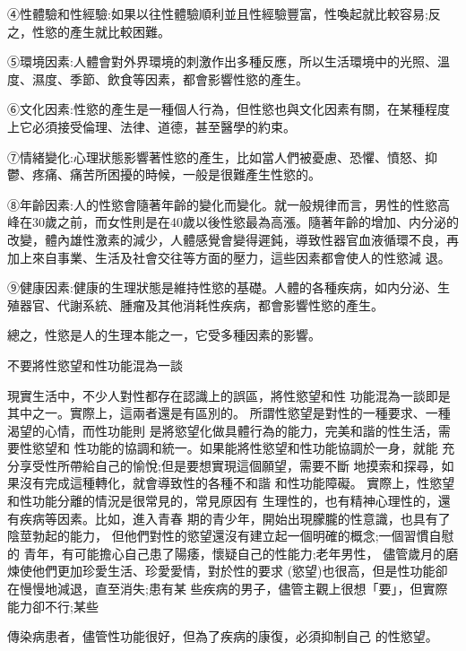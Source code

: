 \documentclass[12pt,UTF8]{ctexbook}
\begin{document}
④性體驗和性經驗:如果以往性體驗順利並且性經驗豐富，性喚起就比較容易;反之，性慾的產生就比較困難。

⑤環境因素:人體會對外界環境的刺激作出多種反應，所以生活環境中的光照、溫度、濕度、季節、飲食等因素，都會影響性慾的產生。

⑥文化因素:性慾的產生是一種個人行為，但性慾也與文化因素有關，在某種程度上它必須接受倫理、法律、道德，甚至醫學的約束。

⑦情緒變化:心理狀態影響著性慾的產生，比如當人們被憂慮、恐懼、憤怒、抑鬱、疼痛、痛苦所困擾的時候，一般是很難產生性慾的。

⑧年齡因素:人的性慾會隨著年齡的變化而變化。就一般規律而言，男性的性慾高峰在30歲之前，而女性則是在40歲以後性慾最為高漲。隨著年齡的增加、内分泌的改變，體內雄性激素的減少，人體感覺會變得遲鈍，導致性器官血液循環不良，再加上來自事業、生活及社會交往等方面的壓力，這些因素都會使人的性慾減
退。

⑨健康因素:健康的生理狀態是維持性慾的基礎。人體的各種疾病，如内分泌、生殖器官、代謝系統、腫瘤及其他消耗性疾病，都會影響性慾的產生。

總之，性慾是人的生理本能之一，它受多種因素的影響。

不要將性慾望和性功能混為一談

現實生活中，不少人對性都存在認識上的誤區，將性慾望和性
功能混為一談即是其中之一。實際上，這兩者還是有區別的。
所謂性慾望是對性的一種要求、一種渴望的心情，而性功能則
是將慾望化做具體行為的能力，完美和諧的性生活，需要性慾望和
性功能的協調和統一。如果能將性慾望和性功能協調於一身，就能
充分享受性所帶給自己的愉悅;但是要想實現這個願望，需要不斷
地摸索和探尋，如果沒有完成這種轉化，就會導致性的各種不和諧
和性功能障礙。
實際上，性慾望和性功能分離的情況是很常見的，常見原因有
生理性的，也有精神心理性的，還有疾病等因素。比如，進入青春
期的青少年，開始出現朦朧的性意識，也具有了陰莖勃起的能力，
但他們對性的慾望還沒有建立起一個明確的概念;一個習慣自慰的
青年，有可能擔心自己患了陽痿，懷疑自己的性能力;老年男性，
儘管歲月的磨煉使他們更加珍愛生活、珍愛愛情，對於性的要求
(慾望)也很高，但是性功能卻在慢慢地減退，直至消失;患有某
些疾病的男子，儘管主觀上很想「要」，但實際能力卻不行;某些

傳染病患者，儘管性功能很好，但為了疾病的康復，必須抑制自己
的性慾望。



\backmatter
\end{document}
